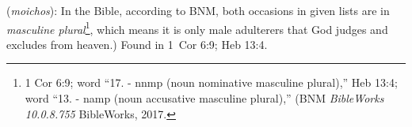 \item[Adulterer,]

(\textit{moichos}):
In the Bible, according to BNM, both occasions in given lists are in \emph{masculine plural}\footnote{1 Cor 6:9; word ``17.  - nnmp (noun nominative masculine plural),'' Heb 13:4; word ``13.  - namp (noun accusative masculine plural),'' (BNM \emph{BibleWorks 10.0.8.755} BibleWorks, 2017.}, which means it is only male adulterers that God judges and excludes from heaven.)
Found in 1~Cor 6:9; Heb 13:4.
